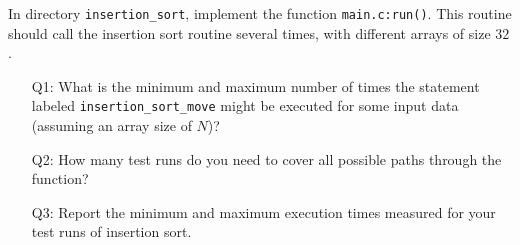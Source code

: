 \label{problem:1}

In directory \texttt{insertion\_sort}, implement the function
\texttt{main.c:run()}. This routine should call the insertion
sort routine several times, with different arrays of size $32$.

\begin{itemize}
\item[Q1:] What is the minimum and maximum number of times the statement
           labeled \texttt{insertion\_sort\_move} might be
           executed for some input data (assuming an array size of $N$)?
\item[Q2:] How many test runs do you need to cover all possible paths through
           the function?
\item[Q3:] Report the minimum and maximum execution times measured for
           your test runs of insertion sort.
\end{itemize}
